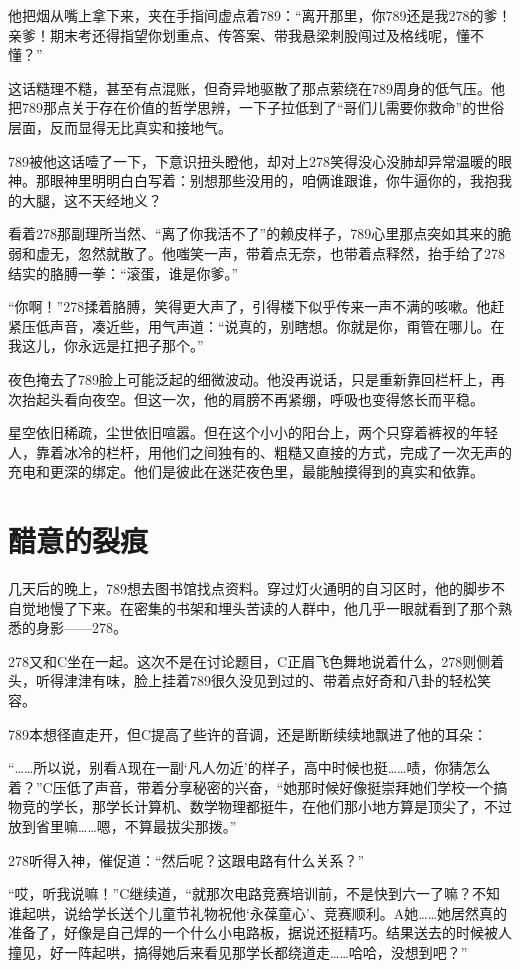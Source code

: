 \documentclass[a4paper]{book}
\begin{document}
他把烟从嘴上拿下来，夹在手指间虚点着789：“离开那里，你789还是我278的爹！亲爹！期末考还得指望你划重点、传答案、带我悬梁刺股闯过及格线呢，懂不懂？”

这话糙理不糙，甚至有点混账，但奇异地驱散了那点萦绕在789周身的低气压。他把789那点关于存在价值的哲学思辨，一下子拉低到了“哥们儿需要你救命”的世俗层面，反而显得无比真实和接地气。

789被他这话噎了一下，下意识扭头瞪他，却对上278笑得没心没肺却异常温暖的眼神。那眼神里明明白白写着：别想那些没用的，咱俩谁跟谁，你牛逼你的，我抱我的大腿，这不天经地义？

看着278那副理所当然、“离了你我活不了”的赖皮样子，789心里那点突如其来的脆弱和虚无，忽然就散了。他嗤笑一声，带着点无奈，也带着点释然，抬手给了278结实的胳膊一拳：“滚蛋，谁是你爹。”

“你啊！”278揉着胳膊，笑得更大声了，引得楼下似乎传来一声不满的咳嗽。他赶紧压低声音，凑近些，用气声道：“说真的，别瞎想。你就是你，甭管在哪儿。在我这儿，你永远是扛把子那个。”

夜色掩去了789脸上可能泛起的细微波动。他没再说话，只是重新靠回栏杆上，再次抬起头看向夜空。但这一次，他的肩膀不再紧绷，呼吸也变得悠长而平稳。

星空依旧稀疏，尘世依旧喧嚣。但在这个小小的阳台上，两个只穿着裤衩的年轻人，靠着冰冷的栏杆，用他们之间独有的、粗糙又直接的方式，完成了一次无声的充电和更深的绑定。他们是彼此在迷茫夜色里，最能触摸得到的真实和依靠。
\normalsize
\section{醋意的裂痕}
\songti{}
几天后的晚上，789想去图书馆找点资料。穿过灯火通明的自习区时，他的脚步不自觉地慢了下来。在密集的书架和埋头苦读的人群中，他几乎一眼就看到了那个熟悉的身影——278。

278又和C坐在一起。这次不是在讨论题目，C正眉飞色舞地说着什么，278则侧着头，听得津津有味，脸上挂着789很久没见到过的、带着点好奇和八卦的轻松笑容。

789本想径直走开，但C提高了些许的音调，还是断断续续地飘进了他的耳朵：

“……所以说，别看A现在一副‘凡人勿近’的样子，高中时候也挺……啧，你猜怎么着？”C压低了声音，带着分享秘密的兴奋，“她那时候好像挺崇拜她们学校一个搞物竞的学长，那学长计算机、数学物理都挺牛，在他们那小地方算是顶尖了，不过放到省里嘛……嗯，不算最拔尖那拨。”

278听得入神，催促道：“然后呢？这跟电路有什么关系？”

“哎，听我说嘛！”C继续道，“就那次电路竞赛培训前，不是快到六一了嘛？不知谁起哄，说给学长送个儿童节礼物祝他‘永葆童心’、竞赛顺利。A她……她居然真的准备了，好像是自己焊的一个什么小电路板，据说还挺精巧。结果送去的时候被人撞见，好一阵起哄，搞得她后来看见那学长都绕道走……哈哈，没想到吧？”
\end{document}
